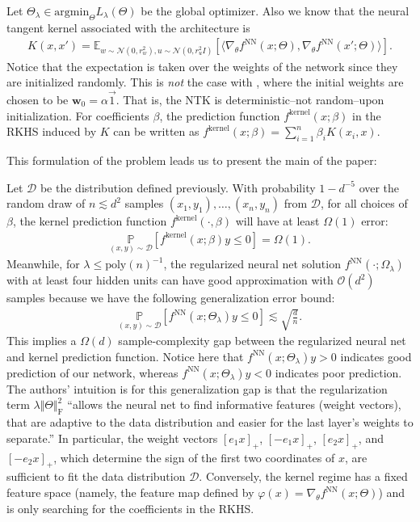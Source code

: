 \documentclass{article}
\newenvironment{manualtheorem}[1]{%
  \renewcommand\themanualtheoreminner{#1}%
  \manualtheoreminner
}{\endmanualtheoreminner}
\begin{document}
Let $\Theta_{\lambda} \in \text{argmin}_{\Theta} L_{\lambda}(\Theta)$ be the global optimizer. Also we know that the neural tangent kernel associated with the architecture is
\begin{align*}
   K(x, x') = \mathbb{E}_{w \sim \mathcal{N}(0, r_w^2), u \sim \mathcal{N}(0, r_u^2I)}[\langle \nabla_{\theta}f^{\text{NN}}(x; \Theta), \nabla_{\theta}f^{\text{NN}}(x'; \Theta)  \rangle].
\end{align*}
Notice that the expectation is taken over the weights of the network since they are initialized randomly. This is \textit{not} the case with \cite{woodworth2020kernel}, where the initial weights are chosen to be $\boldsymbol{w}_0 = \alpha \vec{1}$. That is, the NTK is deterministic--not random--upon initialization. For coefficients $\beta$, the prediction function $f^{\text{kernel}}(x; \beta)$ in the RKHS induced by $K$ can be written as $f^{\text{kernel}}(x; \beta) = \sum_{i=1}^n \beta_i K(x_i, x)$. 

This formulation of the problem leads us to present the main of the paper:
\begin{manualtheorem}{2.1}
Let $\mathcal{D}$ be the distribution defined previously. With probability $1 - d^{-5}$ over the random draw of $n \lesssim d^2$ samples $(x_1, y_1), \ldots, (x_n, y_n)$ from $\mathcal{D}$, for all choices of $\beta$, the kernel prediction function $f^{\text{kernel}}(\cdot, \beta)$ will have at least $\Omega(1)$ error:
\begin{align*}
    \underset{(x, y) \sim \mathcal{D}}{\mathbb{P}}[f^{\text{kernel}}(x; \beta)y \leq 0] = \Omega(1).
\end{align*}
Meanwhile, for $\lambda \leq \text{poly}(n)^{-1}$, the regularized neural net solution $f^{\text{NN}}(\cdot; \Omega_{\lambda})$ with at least four hidden units can have good approximation with $\mathcal{O}(d^2)$ samples because we have the following generalization error bound:
\begin{align*}
    \underset{(x,y) \sim \mathcal{D}}{\mathbb{P}}[f^{\text{NN}}(x;\Theta_{\lambda})y \leq 0] \lesssim \sqrt{\frac{d}{n}}.
\end{align*}
This implies a $\Omega(d)$ sample-complexity gap between the regularized neural net and kernel prediction function.
\end{manualtheorem}
Notice here that $f^{\text{NN}}(x;\Theta_{\lambda})y > 0$ indicates good prediction of our network, whereas $f^{\text{NN}}(x;\Theta_{\lambda})y < 0$ indicates poor prediction. The authors' intuition is for this generalization gap is that the regularization term $\lambda \Vert \Theta \Vert_{\text{F}}^2$ \enquote{allows the neural net to find informative features
(weight vectors), that are adaptive to the data distribution and easier for the last layer’s weights to separate.} In particular, the weight vectors $[ e_1x ]_+$, $[-e_1x ]_+$, $[e_2x ]_+$, and $[-e_2x ]_+$, which determine the sign of the first two coordinates of $x$, are sufficient to fit the data distribution $\mathcal{D}$. Conversely, the kernel regime has a fixed feature space (namely, the feature map defined by $\varphi(x) = \nabla_{\theta}f^{\text{NN}}(x; \Theta)$) and is only searching for the coefficients in the RKHS.
\end{document}
